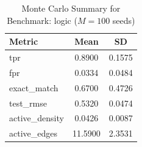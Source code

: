 \begin{table}[ht]
\centering
\caption{Monte Carlo Summary for Benchmark: logic ($M = 100$ seeds)}
\begin{tabular}{lcc}
\hline
Metric & Mean & SD \\
\hline
tpr & 0.8900 & 0.1575 \\
fpr & 0.0334 & 0.0484 \\
exact\_match & 0.6700 & 0.4726 \\
test\_rmse & 0.5320 & 0.0474 \\
active\_density & 0.0426 & 0.0087 \\
active\_edges & 11.5900 & 2.3531 \\
\hline
\end{tabular}
\end{table}
